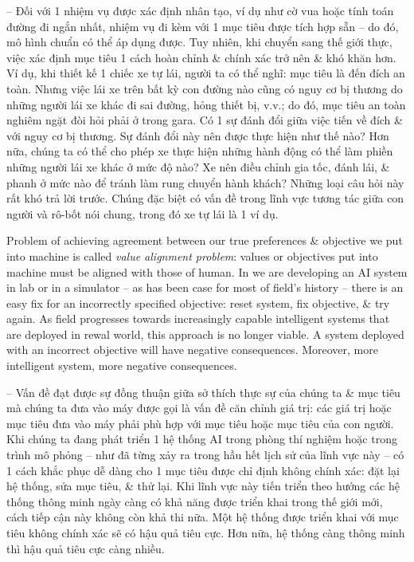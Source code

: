 \documentclass{article}
\begin{document}
\begin{itemize}
\begin{itemize}
\begin{itemize}
\begin{itemize}
				-- Đối với 1 nhiệm vụ được xác định nhân tạo, ví dụ như cờ vua hoặc tính toán đường đi ngắn nhất, nhiệm vụ đi kèm với 1 mục tiêu được tích hợp sẵn -- do đó, mô hình chuẩn có thể áp dụng được. Tuy nhiên, khi chuyển sang thế giới thực, việc xác định mục tiêu 1 cách hoàn chỉnh \& chính xác trở nên \& khó khăn hơn. Ví dụ, khi thiết kế 1 chiếc xe tự lái, người ta có thể nghĩ: mục tiêu là đến đích an toàn. Nhưng việc lái xe trên bất kỳ con đường nào cũng có nguy cơ bị thương do những người lái xe khác đi sai đường, hỏng thiết bị, v.v.; do đó, mục tiêu an toàn nghiêm ngặt đòi hỏi phải ở trong gara. Có 1 sự đánh đổi giữa việc tiến về đích \& với nguy cơ bị thương. Sự đánh đổi này nên được thực hiện như thế nào? Hơn nữa, chúng ta có thể cho phép xe thực hiện những hành động có thể làm phiền những người lái xe khác ở mức độ nào? Xe nên điều chỉnh gia tốc, đánh lái, \& phanh ở mức nào để tránh làm rung chuyển hành khách? Những loại câu hỏi này rất khó trả lời trước. Chúng đặc biệt có vấn đề trong lĩnh vực tương tác giữa con người và rô-bốt nói chung, trong đó xe tự lái là 1 ví dụ.
				
				Problem of achieving agreement between our true preferences \& objective we put into machine is called {\it value alignment problem}: values or objectives put into machine must be aligned with those of human. In we are developing an AI system in lab or in a simulator -- as has been case for most of field's history -- there is an easy fix for an incorrectly specified objective: reset system, fix objective, \& try again. As field progresses towards increasingly capable intelligent systems that are deployed in rewal world, this approach is no longer viable. A system deployed with an incorrect objective will have negative consequences. Moreover, more intelligent system, more negative consequences.
				
				-- Vấn đề đạt được sự đồng thuận giữa sở thích thực sự của chúng ta \& mục tiêu mà chúng ta đưa vào máy được gọi là vấn đề căn chỉnh giá trị: các giá trị hoặc mục tiêu đưa vào máy phải phù hợp với mục tiêu hoặc mục tiêu của con người. Khi chúng ta đang phát triển 1 hệ thống AI trong phòng thí nghiệm hoặc trong trình mô phỏng -- như đã từng xảy ra trong hầu hết lịch sử của lĩnh vực này -- có 1 cách khắc phục dễ dàng cho 1 mục tiêu được chỉ định không chính xác: đặt lại hệ thống, sửa mục tiêu, \& thử lại. Khi lĩnh vực này tiến triển theo hướng các hệ thống thông minh ngày càng có khả năng được triển khai trong thế giới mới, cách tiếp cận này không còn khả thi nữa. Một hệ thống được triển khai với mục tiêu không chính xác sẽ có hậu quả tiêu cực. Hơn nữa, hệ thống càng thông minh thì hậu quả tiêu cực càng nhiều.
				

\end{itemize}
\end{itemize}
\end{itemize}
\end{itemize}
\end{document}
